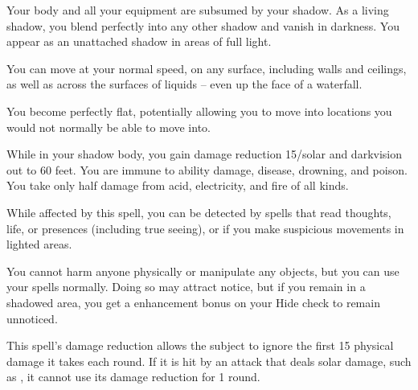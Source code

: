 \begin{spelleffect}
  Your body and all your equipment are subsumed by your shadow. As a living shadow, you blend perfectly into any other shadow and vanish in darkness. You appear as an unattached shadow in areas of full light.
  \par You can move at your normal speed, on any surface, including walls and ceilings, as well as across the surfaces of liquids -- even up the face of a waterfall.
  \par You become perfectly flat, potentially allowing you to move into locations you would not normally be able to move into.
  \par While in your shadow body, you gain damage reduction 15/solar and darkvision out to 60 feet. You are immune to ability damage, disease, drowning, and poison. You take only half damage from acid, electricity, and fire of all kinds.
  \par While affected by this spell, you can be detected by spells that read thoughts, life, or presences (including true seeing), or if you make suspicious movements in lighted areas.
  \par You cannot harm anyone physically or manipulate any objects, but you can use your spells normally. Doing so may attract notice, but if you remain in a shadowed area, you get a  enhancement bonus on your Hide check to remain unnoticed.
\end{spelleffect}
\begin{spellnotes}
  This spell's damage reduction allows the subject to ignore the first 15 physical damage it takes each round. If it is hit by an attack that deals solar damage, such as , it cannot use its damage reduction for 1 round.
\end{spellnotes}

